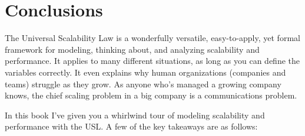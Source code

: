 \documentclass{vivid_layout}
\begin{document}
\section{Conclusions}

The Universal Scalability Law is a wonderfully versatile, easy-to-apply, yet
formal framework for modeling, thinking about, and analyzing scalability and
performance. It applies to many different situations, as long as you can define
the variables correctly. It even explains why human organizations (companies and
teams) struggle as they grow. As anyone who's managed a growing company knows,
the chief scaling problem in a big company is a communications problem.

In this book I've given you a whirlwind tour of modeling scalability and
performance with the USL. A few of the key takeaways are as follows:
\end{document}
